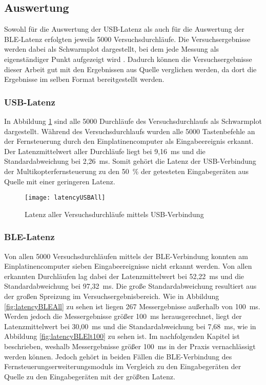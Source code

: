 \subsection{Auswertung}
Sowohl für die Auswertung der \acs{USB}-Latenz als auch für die Auswertung der \ac{BLE}-Latenz erfolgten jeweils 5000 Versuchsdurchläufe. Die Versuchsergebnisse werden dabei als Schwarmplot dargestellt, bei dem jede Messung als eigenständiger Punkt aufgezeigt wird \cite[S.~7]{wimmerLatenzStation}. Dadurch können die Versuchsergebnisse dieser Arbeit gut mit den Ergebnissen aus Quelle \cite{wimmerLatenzStation} verglichen werden, da dort die Ergebnisse im selben Format bereitgestellt werden. 

\subsubsection{\acs{USB}-Latenz}
In Abbildung \ref{fig:latencyUSBAll} sind alle 5000 Durchläufe des Versuchsdurchlaufs als Schwarmplot dargestellt. Während des Versuchsdurchlaufs wurden alle 5000 Tastenbefehle an der Fernsteuerung durch den Einplatinencomputer als Eingabeereignis erkannt. Der Latenzmittelwert aller Durchläufe liegt bei 9,16~ms und die Standardabweichung bei 2,26~ms. Somit gehört die Latenz der \acs{USB}-Verbindung der Multikopterfernsteuerung zu den 50~\% der getesteten Eingabegeräten aus Quelle \cite{wimmerLatenzStation} mit einer geringeren Latenz.

\begin{figure}[H]
    \centering
    \texttt{[image: latencyUSBAll]}
    \caption{Latenz aller Versuchsdurchläufe mittels \acs{USB}-Verbindung}
    \label{fig:latencyUSBAll}
\end{figure}

\subsubsection{\ac{BLE}-Latenz}
Von allen 5000 Versuchsdurchläufen mittels der \ac{BLE}-Verbindung konnten am Einplatinencomputer sieben Eingabeereignisse nicht erkannt werden. Von allen erkannten Durchläufen lag dabei der Latenzmittelwert bei 52,22~ms und die Standardabweichung bei 97,32~ms. Die große Standardabweichung resultiert aus der großen Spreizung im Versuchsergebnisbereich. Wie in Abbildung \ref{fig:latencyBLEAll} zu sehen ist liegen 267 Messergebnisse außerhalb von 100~ms. Werden jedoch die Messergebnisse größer 100~ms herausgerechnet, liegt der Latenzmittelwert bei 30,00~ms und die Standardabweichung bei 7,68~ms, wie in Abbildung \ref{fig:latencyBLElt100} zu sehen ist. Im nachfolgenden Kapitel ist beschrieben, weshalb Messergebnisse größer 100~ms in der Praxis vernachlässigt werden können. Jedoch gehört in beiden Fällen die \ac{BLE}-Verbindung des Fernsteuerungserweiterungsmoduls im Vergleich zu den Eingabegeräten der Quelle \cite{wimmerLatenzStation} zu den Eingabegeräten mit der größten Latenz.

